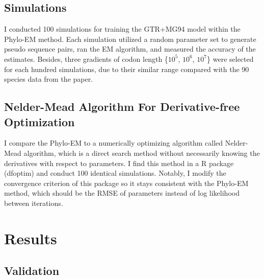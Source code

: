 \subsection{Simulations}
I conducted 100 simulations for training the GTR+MG94 model within the Phylo-EM method. Each simulation utilized a random parameter set to generate pseudo sequence pairs, ran the EM algorithm, and measured the accuracy of the estimates. Besides, three gradients of codon length \{$10^5$, $10^6$, $10^7$\} were selected for each hundred simulations, due to their similar range compared with the 90 species data from the paper. 

\subsection{Nelder-Mead Algorithm For Derivative-free Optimization}
I compare the Phylo-EM to a numerically optimizing algorithm called Nelder-Mead algorithm, which is a direct search method without necessarily knowing the derivatives with respect to parameters. I find this method in a R package (dfoptim) and conduct 100 identical simulations. 
Notably, I modify the convergence criterion of this package so it stays consistent with the Phylo-EM method, which should be the RMSE of parameters instead of log likelihood between iterations. 


\section{Results}
\subsection{Validation}


